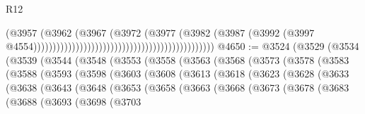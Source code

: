 \begin{lexlean}{R12}
\begin{coremodule}
{{{{{{{{{{{{{{{{{{{{{{{{{{{{{{{{{{{{{{{{{{{{{{{{{{{{{{{{{{{{{{{{{{{{{{{{{{{{{{{{{{                                                                                (@3957
                                                                                  (@3962
                                                                                    (@3967
                                                                                      (@3972
                                                                                        (@3977
                                                                                          (@3982
                                                                                            (@3987
                                                                                              (@3992
                                                                                                (@3997
                                                                                                  @4554)))))))))))))))))))))))))))))))))))))))))))))))
@4650 := @3524
    (@3529
      (@3534
        (@3539
          (@3544
            (@3548
              (@3553
                (@3558
                  (@3563
                    (@3568
                      (@3573
                        (@3578
                          (@3583
                            (@3588
                              (@3593
                                (@3598
                                  (@3603
                                    (@3608
                                      (@3613
                                        (@3618
                                          (@3623
                                            (@3628
                                              (@3633
                                                (@3638
                                                  (@3643
                                                    (@3648
                                                      (@3653
                                                        (@3658
                                                          (@3663
                                                            (@3668
                                                              (@3673
                                                                (@3678
                                                                  (@3683
                                                                    (@3688
                                                                      (@3693
                                                                        (@3698
                                                                          (@3703
}}}}}}}}}}}}}}}}}}}}}}}}}}}}}}}}}}}}}}}}}}}}}}}}}}}}}}}}}}}}}}}}}}}}}}}}}}}}}}}}}}
\end{coremodule}
\end{lexlean}
